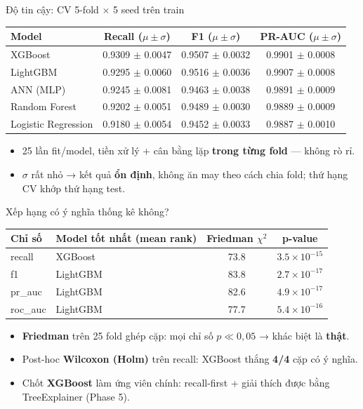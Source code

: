 \documentclass[aspectratio=169,11pt]{beamer}
\begin{document}
\begin{frame}{Độ tin cậy: CV 5-fold $\times$ 5 seed trên train}
\centering\small
\begin{tabular}{@{}lccc@{}}
\toprule
\textbf{Model} & \textbf{Recall ($\mu\pm\sigma$)} & \textbf{F1 ($\mu\pm\sigma$)} & \textbf{PR-AUC ($\mu\pm\sigma$)} \\
\midrule
    XGBoost & 0.9309 $\pm$ 0.0047 & 0.9507 $\pm$ 0.0032 & 0.9901 $\pm$ 0.0008 \\
    LightGBM & 0.9295 $\pm$ 0.0060 & 0.9516 $\pm$ 0.0036 & 0.9907 $\pm$ 0.0008 \\
    ANN (MLP) & 0.9245 $\pm$ 0.0081 & 0.9463 $\pm$ 0.0038 & 0.9891 $\pm$ 0.0009 \\
    Random Forest & 0.9202 $\pm$ 0.0051 & 0.9489 $\pm$ 0.0030 & 0.9889 $\pm$ 0.0009 \\
    Logistic Regression & 0.9180 $\pm$ 0.0054 & 0.9452 $\pm$ 0.0033 & 0.9887 $\pm$ 0.0010 \\
\bottomrule
\end{tabular}
\vspace{3mm}
\begin{itemize}\small
  \item 25 lần fit/model, tiền xử lý + cân bằng lặp \textbf{trong từng fold} — không rò rỉ.
  \item $\sigma$ rất nhỏ → kết quả \textbf{ổn định}, không ăn may theo cách chia fold; thứ hạng CV khớp thứ hạng test.
\end{itemize}
\end{frame}

\begin{frame}{Xếp hạng có ý nghĩa thống kê không?}
\centering\small
\begin{tabular}{@{}llcc@{}}
\toprule
\textbf{Chỉ số} & \textbf{Model tốt nhất (mean rank)} & \textbf{Friedman $\chi^2$} & \textbf{p-value} \\
\midrule
    recall & XGBoost & 73.8 & $3.5\times 10^{-15}$ \\
    f1 & LightGBM & 83.8 & $2.7\times 10^{-17}$ \\
    pr\_auc & LightGBM & 82.6 & $4.9\times 10^{-17}$ \\
    roc\_auc & LightGBM & 77.7 & $5.4\times 10^{-16}$ \\
\bottomrule
\end{tabular}
\vspace{3mm}
\begin{itemize}\small
  \item \textbf{Friedman} trên 25 fold ghép cặp: mọi chỉ số $p \ll 0{,}05$ → khác biệt là \textbf{thật}.
  \item Post-hoc \textbf{Wilcoxon (Holm)} trên recall: XGBoost thắng \textbf{4/4} cặp có ý nghĩa.
  \item Chốt \textbf{XGBoost} làm ứng viên chính: recall-first + giải thích được bằng TreeExplainer (Phase 5).
\end{itemize}
\end{frame}
\end{document}
